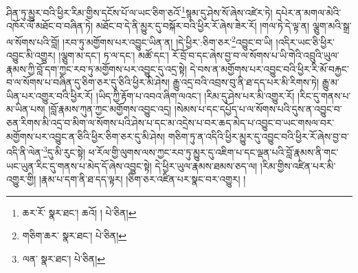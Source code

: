 ཤིན་ཏུ་མྱུར་བའི་ཕྱིར་རིམ་གྱིས་དངོས་པོ་ལ་ཡང་ཅིག་ཅའོ་\footnote{ཆར་རོ་  སྣར་ཐང་། ཆའོ། །  པེ་ཅིན། }སྙམ་དུ་ཤེས་སོ་ཞེས་འཛེར་ཏེ། དཔེར་ན་མགལ་མེའི་འཁོར་ལོ་མཐོང་བ་བཞིན་ཏེ། མཐོང་བ་དེ་ནི་མྱུར་དུ་བསྐོར་བའི་ཕྱིར་རོ་ཞེས་ཟེར་རོ། །གལ་ཏེ་དེ་ལྟ་ན། ལྕུག་མའི་སྒྲ་ལ་སོགས་པའི་བློ། །རབ་ཏུ་མགྱོགས་པར་འབྱུང་ཡིན་ན། །དེ་ཕྱིར་:ཅིག་ཅར་\footnote{གཅིག་ཆར་  སྣར་ཐང་།  པེ་ཅིན། }འབྱུང་བ་ཡི། །འདིར་ཡང་ཅི་ཕྱིར་འབྱུང་མི་འགྱུར། །ལྕུག་མ་དང་། ཏ་ལ་དང་། མཚོ་དང་། རོ་བྲོ་བ་དང་ཞེས་བྱ་བ་ལ་སོགས་པ་ཡི་གེའི་འབྲུའི་ཡུལ་རྣམས་ཀྱི་བློ་དག་ཀྱང་རབ་ཏུ་མགྱོགས་པར་འབྱུང་དུ་འདྲ་སྟེ། དེ་བས་ན་མགྱོགས་པར་འབྱུང་བའི་ཕྱིར་རི་མོ་བརྐྱང་བ་ལ་སོགས་པ་བཞིན་དུ་ཅིག་ཅར་དུ་ཅིའི་ཕྱིར་མི་ཤེས། རྒྱུ་འདྲ་བའི་འབྲས་བུ་ནི་ཐ་དད་པར་མི་རིགས་ཏེ། རྒྱུ་མ་ཡིན་པར་འགྱུར་བའི་ཕྱིར་རོ། །ཡིད་ཀྱི་རྟོག་པ་འབའ་ཞིག་ལའང་། །རིམ་དུ་ཤེས་པར་མི་འགྱུར་རོ། །རིང་དུ་གནས་པ་མ་ཡིན་པས། །བློ་རྣམས་ཀུན་ཀྱང་མགྱོགས་འབྱུང་འདྲ། །སེམས་པ་དང་དཔྱོད་པ་ལ་སོགས་པའི་དུས་ན་འབྱུང་བ་ཅན་རིགས་མི་འདྲ་བ་མིག་ལ་སོགས་པའི་ཤེས་པ་དང་མ་འདྲེས་པ་བར་ཆད་མེད་པ་འབྱུང་བ་ཡང་གསལ་བར་མགྱོགས་པར་འབྱུང་ན་ཅིའི་ཕྱིར་ཅིག་ཅར་དུ་མི་ཤེས། གཅིག་ཏུ་ན་འདིའི་ཕྱིར་མྱུར་དུ་འབྱུང་བའི་ཕྱིར་རོ་ཞེས་བྱ་བ་འདི་ནི་ལེན་\footnote{ལན་  སྣར་ཐང་།  པེ་ཅིན། }དུ་མི་རུང་སྟེ། ཕ་རོལ་གྱི་ལུགས་ལས་ཀྱང་རབ་ཏུ་མྱུར་དུ་འཇིག་པ་དང་ལྡན་པའི་བློ་རྣམས་ནི་གང་ཡང་ཡུན་རིང་དུ་གནས་པ་མེད་དོ་ཞེས་འབྱུང་སྟེ། དེ་ཕྱིར་ཡུལ་རྣམས་ཐམས་ཅད་ལ། །རིམ་གྱིས་འཛིན་པར་མི་འགྱུར་གྱི། །རྣམ་པ་དག་ནི་ཐ་དད་ལྟར། །ཅིག་ཅར་འཛིན་པར་སྣང་བར་འགྱུར། །
